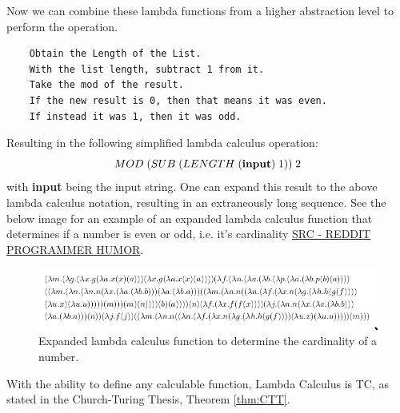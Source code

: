 Now we can combine these lambda functions from a higher abstraction level to perform the operation.

\begin{verbatim}
    Obtain the Length of the List.
    With the list length, subtract 1 from it.
    Take the mod of the result.
    If the new result is 0, then that means it was even.
    If instead it was 1, then it was odd.
\end{verbatim}

Resulting in the following simplified lambda calculus operation:\[MOD \hspace{0.1cm} (SUB \hspace{0.1cm} (LENGTH \hspace{0.1cm} (\textbf{input}) \hspace{0.1cm} 1)) \hspace{0.1cm} 2\]
with \textbf{input} being the input string.
One can expand this result to the above lambda calculus notation, resulting in an extraneously long sequence.
See the below image for an example of an expanded lambda calculus function that determines if a number is even or odd, i.e. it's cardinality \href{https://www.reddit.com/r/ProgrammerHumor/comments/78z90f/when_you_need_to_know_if_a_number_is_even_or_odd/}{SRC - REDDIT PROGRAMMER HUMOR}.

\begin{figure}[htb]
    \centering
    \includegraphics[width=16cm]{Images/oddevenlambda.png}
       \caption{Expanded lambda calculus function to determine the cardinality of a number.}
           \label{Fig:OddEvenLambda}
\end{figure}

With the ability to define any calculable function, Lambda Calculus is TC, as stated in the Church-Turing Thesis, Theorem \ref{thm:CTT}.